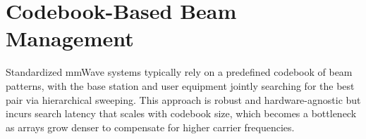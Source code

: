 \section{Codebook-Based Beam Management}
Standardized mmWave systems typically rely on a predefined codebook of beam
patterns, with the base station and user equipment jointly searching for the
best pair via hierarchical sweeping. This approach is robust and
hardware-agnostic but incurs search latency that scales with codebook size,
which becomes a bottleneck as arrays grow denser to compensate for higher
carrier frequencies.
